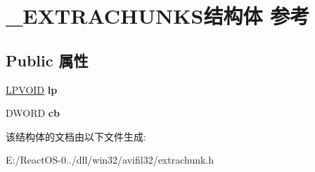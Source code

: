 \hypertarget{struct___e_x_t_r_a_c_h_u_n_k_s}{}\section{\+\_\+\+E\+X\+T\+R\+A\+C\+H\+U\+N\+K\+S结构体 参考}
\label{struct___e_x_t_r_a_c_h_u_n_k_s}
\subsection*{Public 属性}
\begin{DoxyCompactItemize}
\item 
\mbox{\label{struct___e_x_t_r_a_c_h_u_n_k_s_acf3090f138e48e7a7c34d6d70dd7b384}} 
\hyperlink{interfacevoid}{L\+P\+V\+O\+ID} {\bfseries lp}
\item 
\mbox{\label{struct___e_x_t_r_a_c_h_u_n_k_s_a2891e7c1daf5f58b4f66c32f7a7a2c90}} 
D\+W\+O\+RD {\bfseries cb}
\end{DoxyCompactItemize}


该结构体的文档由以下文件生成\+:\begin{DoxyCompactItemize}
\item 
E\+:/\+React\+O\+S-\/0../dll/win32/avifil32/extrachunk.\+h\end{DoxyCompactItemize}

